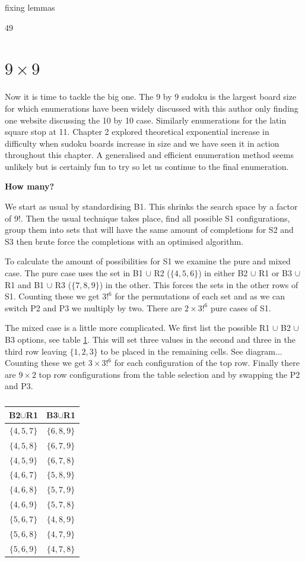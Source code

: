 \documentclass[a4paper,11pt]{report}
\newcounter{row}
\begin{document}
{fixing lemmas

49
	\section{$9 \times  9$}

Now it is time to tackle the big one. The 9 by 9 sudoku is the largest board size for which enumerations have been widely discussed with this author only finding one website discussing the 10 by 10 case. Similarly enumerations for the latin square stop at 11. Chapter 2 explored theoretical exponential increase in difficulty when sudoku boards increase in size and we have seen it in action throughout this chapter. A generalised and efficient enumeration method seems unlikely but is certainly fun to try so let us continue to the final enumeration.

\textbf{How many?}

We start as usual by standardising B1. This shrinks the search space by a factor of 9!. Then the usual technique takes place, find all possible S1 configurations, group them into sets that will have the same amount of completions for S2 and S3 then brute force the completions with an optimised algorithm.

To calculate the amount of possibilities for S1 we examine the pure and mixed case. The pure case uses the set  in B1 $\cup$ R2 ($\{4,5,6\}$) in either B2 $\cup$ R1 or B3 $\cup$ R1 and B1 $\cup$ R3 ($\{7,8,9\}$) in the other. This forces the sets in the other rows of S1. Counting these we get $3!^6$ for the permutations of each set and as we can switch P2 and P3 we multiply by two. There are $2\times 3!^6$ pure cases of S1. 

The mixed case is a little more complicated. We first list the possible R1 $\cup$ B2 $\cup$ B3 options, see table \ref{table:mixed99}. This will set three values in the second and three in the third row leaving $\{1,2,3\}$ to be placed in the remaining cells. See diagram... Counting these we get $3\times3!^6$ for each configuration of the top row. Finally there are $9\times 2$ top row configurations from the table selection and by swapping the P2 and P3. 

\begin{table}[!h]
\begin{center}
\begin{tabular}{ |c|c| }
 \hline
B2$\cup$R1  & B3$\cup$R1\\
 \hline
$\{4,5,7\}$&$\{6,8,9\}$\\
$\{4,5,8\}$&$\{6,7,9\}$\\
$\{4,5,9\}$&$\{6,7,8\}$\\
$\{4,6,7\}$&$\{5,8,9\}$\\
$\{4,6,8\}$&$\{5,7,9\}$\\
$\{4,6,9\}$&$\{5,7,8\}$\\
$\{5,6,7\}$&$\{4,8,9\}$\\
$\{5,6,8\}$&$\{4,7,9\}$\\
$\{5,6,9\}$&$\{4,7,8\}$\\
\hline
\end{tabular}
\end{center}
\caption{\label{table:mixed99}}
\end{table}

}
\end{document}
